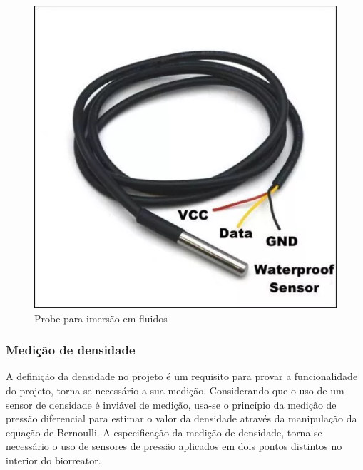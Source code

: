 \begin{figure}[h]
	\centering
	\includegraphics[keepaspectratio=true,scale=0.3]{figuras/probe.eps}
	\caption{Probe para imersão em fluidos}
	\label{probe}
\end{figure}

\subsubsection{Medição de densidade}

A definição da densidade no projeto é um requisito para provar a funcionalidade do projeto, torna-se necessário a sua medição. Considerando que o uso de um sensor de densidade é inviável de medição, usa-se o princípio da medição de pressão diferencial para estimar o valor da densidade através da manipulação da equação de Bernoulli. A especificação da medição de densidade, torna-se necessário o uso de sensores de pressão aplicados em dois pontos distintos no interior do biorreator.

